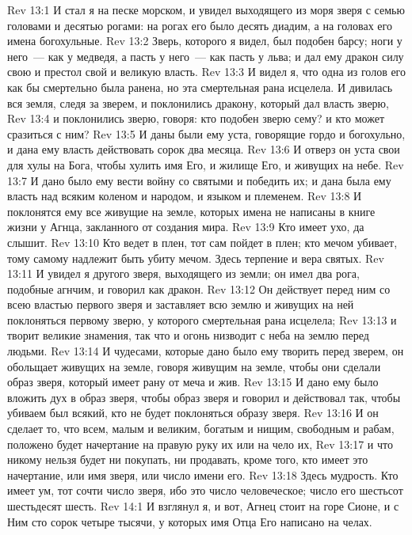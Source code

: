 \vs Rev 13:1 И стал я на песке морском, и увидел выходящего из моря зверя с семью головами и десятью рогами: на рогах его было десять диадим, а на головах его имена богохульные.
\vs Rev 13:2 Зверь, которого я видел, был подобен барсу; ноги у него~--- как у медведя, а пасть у него~--- как пасть у льва; и дал ему дракон силу свою и престол свой и великую власть.
\vs Rev 13:3 И видел я, что одна из голов его как бы смертельно была ранена, но эта смертельная рана исцелела. И дивилась вся земля, следя за зверем, и поклонились дракону, который дал власть зверю,
\vs Rev 13:4 и поклонились зверю, говоря: кто подобен зверю сему? и кто может сразиться с ним?
\vs Rev 13:5 И даны были ему уста, говорящие гордо и богохульно, и дана ему власть действовать сорок два месяца.
\vs Rev 13:6 И отверз он уста свои для хулы на Бога, чтобы хулить имя Его, и жилище Его, и живущих на небе.
\vs Rev 13:7 И дано было ему вести войну со святыми и победить их; и дана была ему власть над всяким коленом и народом, и языком и племенем.
\vs Rev 13:8 И поклонятся ему все живущие на земле, которых имена не написаны в книге жизни у Агнца, закланного от создания мира.
\vs Rev 13:9 Кто имеет ухо, да слышит.
\vs Rev 13:10 Кто ведет в плен, тот сам пойдет в плен; кто мечом убивает, тому самому надлежит быть убиту мечом. Здесь терпение и вера святых.
\rsbpar\vs Rev 13:11 И увидел я другого зверя, выходящего из земли; он имел два рога, подобные агнчим, и говорил как дракон.
\vs Rev 13:12 Он действует перед ним со всею властью первого зверя и заставляет всю землю и живущих на ней поклоняться первому зверю, у которого смертельная рана исцелела;
\vs Rev 13:13 и творит великие знамения, так что и огонь низводит с неба на землю перед людьми.
\vs Rev 13:14 И чудесами, которые дано было ему творить перед зверем, он обольщает живущих на земле, говоря живущим на земле, чтобы они сделали образ зверя, который имеет рану от меча и жив.
\vs Rev 13:15 И дано ему было вложить дух в образ зверя, чтобы образ зверя и говорил и действовал так, чтобы убиваем был всякий, кто не будет поклоняться образу зверя.
\vs Rev 13:16 И он сделает то, что всем, малым и великим, богатым и нищим, свободным и рабам, положено будет начертание на правую руку их или на чело их,
\vs Rev 13:17 и что никому нельзя будет ни покупать, ни продавать, кроме того, кто имеет это начертание, или имя зверя, или число имени его.
\vs Rev 13:18 Здесь мудрость. Кто имеет ум, тот сочти число зверя, ибо это число человеческое; число его шестьсот шестьдесят шесть.
\vs Rev 14:1 И взглянул я, и вот, Агнец стоит на горе Сионе, и с Ним сто сорок четыре тысячи, у которых имя Отца Его написано на челах.
